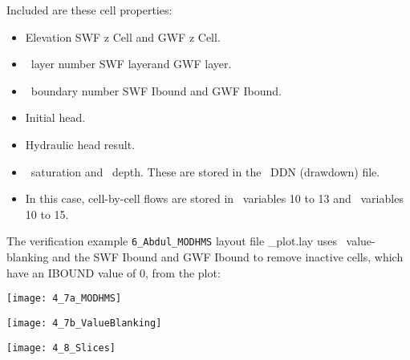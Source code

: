 Included are these cell properties:
\begin{itemize}
    \item Elevation {\sf SWF z Cell} and {\sf GWF z Cell}.
    \item \mf\ layer number  {\sf SWF layer}and {\sf GWF layer}.
    \item \mf\ boundary number {\sf SWF Ibound} and {\sf GWF Ibound}.
    \item Initial head.
    \item Hydraulic head result.
    \item \gwf\ saturation and \swf\ depth.  These are stored in the \mf\ DDN (drawdown) file.
    \item In this case, cell-by-cell flows are stored in \gwf\ variables 10 to 13 and \swf\ variables 10 to 15.
\end{itemize}

The verification example {\tt 6\_Abdul\_MODHMS} layout file {\sf \_plot.lay} uses \tecplot\ value-blanking and the {\sf SWF Ibound} and {\sf GWF Ibound} to remove inactive cells, which have an IBOUND value of 0, from the plot:

        \texttt{[image: 4\_7a\_MODHMS]}


        \texttt{[image: 4\_7b\_ValueBlanking]}



        \texttt{[image: 4\_8\_Slices]}


